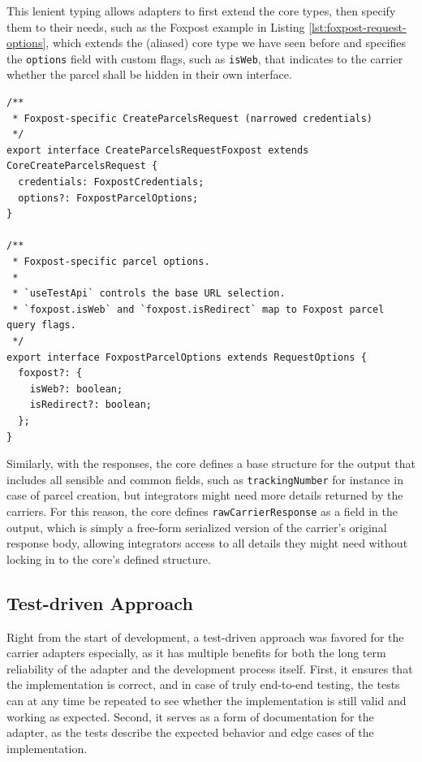\documentclass{imc-inf}
\begin{document}
This lenient typing allows adapters to first extend the core types, then specify them to their needs, such as the Foxpost example in Listing \ref{lst:foxpost-request-options}, which extends the (aliased) core type we have seen before and specifies the \texttt{options} field with custom flags, such as \texttt{isWeb}, that indicates to the carrier whether the parcel shall be hidden in their own interface.

\begin{listing}[!htbp]
  \caption{Adapter, Foxpost-specific request options in \texttt{src/adapters/foxpost/types.ts}}
  \label{lst:foxpost-request-options}
  \begin{verbatim}
/**
 * Foxpost-specific CreateParcelsRequest (narrowed credentials)
 */
export interface CreateParcelsRequestFoxpost extends CoreCreateParcelsRequest {
  credentials: FoxpostCredentials;
  options?: FoxpostParcelOptions;
}

/**
 * Foxpost-specific parcel options.
 *
 * `useTestApi` controls the base URL selection.
 * `foxpost.isWeb` and `foxpost.isRedirect` map to Foxpost parcel query flags.
 */
export interface FoxpostParcelOptions extends RequestOptions {
  foxpost?: {
    isWeb?: boolean;
    isRedirect?: boolean;
  };
}
\end{verbatim}
\end{listing}

Similarly, with the responses, the core defines a base structure for the output that includes all sensible and common fields, such as \texttt{trackingNumber} for instance in case of parcel creation, but integrators might need more details returned by the carriers.
For this reason, the core defines \texttt{rawCarrierResponse} as a field in the output, which is simply a free-form serialized version of the carrier's original response body, allowing integrators access to all details they might need without locking in to the core's defined structure.

\subsection{Test-driven Approach}
Right from the start of development, a test-driven approach was favored for the carrier adapters especially, as it has multiple benefits for both the long term reliability of the adapter and the development process itself.
First, it ensures that the implementation is correct, and in case of truly end-to-end testing, the tests can at any time be repeated to see whether the implementation is still valid and working as expected.
Second, it serves as a form of documentation for the adapter, as the tests describe the expected behavior and edge cases of the implementation.
\end{document}
